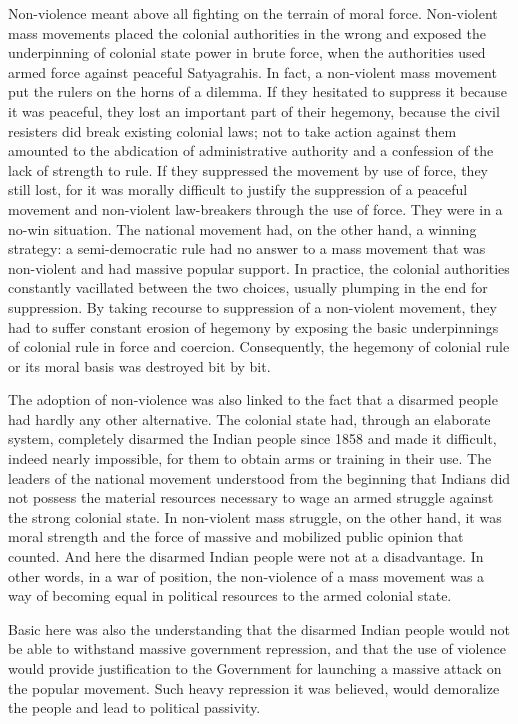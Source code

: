 Non-violence meant above all fighting on the terrain of moral force. Non-violent mass movements placed the colonial authorities in the wrong and exposed the underpinning of colonial state power in brute force, when the authorities used armed force against peaceful Satyagrahis. In fact, a non-violent mass movement put the rulers on the horns of a dilemma. If they hesitated to suppress it because it was peaceful, they lost an important part of their hegemony, because the civil resisters did break existing colonial laws; not to take action against them amounted to the abdication of administrative authority and a confession of the lack of strength to rule. If they suppressed the movement by use of force, they still lost, for it was morally difficult to justify the suppression of a peaceful movement and non-violent law-breakers through the use of force. They were in a no-win situation. The national movement had, on the other hand, a winning strategy: a semi-democratic rule had no answer to a mass movement that was non-violent and had massive popular support. In practice, the colonial authorities constantly vacillated between the two choices, usually plumping in the end for suppression. By taking recourse to suppression of a non-violent movement, they had to suffer constant erosion of hegemony by exposing the basic underpinnings of colonial rule in force and coercion. Consequently, the hegemony of colonial rule or its moral basis was destroyed bit by bit.

The adoption of non-violence was also linked to the fact that a disarmed people had hardly any other alternative. The colonial state had, through an elaborate system, completely disarmed the Indian people since 1858 and made it difficult, indeed nearly impossible, for them to obtain arms or training in their use. The leaders of the national movement understood from the beginning that Indians did not possess the material resources necessary to wage an armed struggle against the strong colonial state. In non-violent mass struggle, on the other hand, it was moral strength and the force of massive and mobilized public opinion that counted. And here the disarmed Indian people were not at a disadvantage. In other words, in a war of position, the non-violence of a mass movement was a way of becoming equal in political resources to the armed colonial state.

Basic here was also the understanding that the disarmed Indian people would not be able to withstand massive government repression, and that the use of violence would provide justification to the Government for launching a massive attack on the popular movement. Such heavy repression it was believed, would demoralize the people and lead to political passivity.

